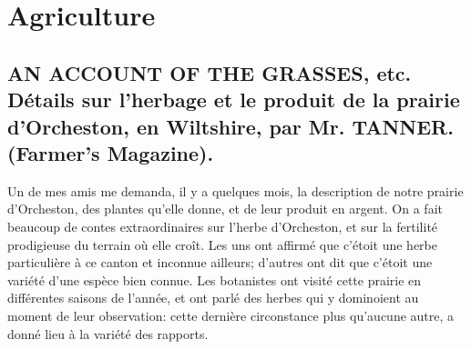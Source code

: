 \setcounter{page}{66}
\chapter{Agriculture}
\section{AN ACCOUNT OF THE GRASSES, etc. Détails sur l'herbage et le produit de la prairie d'Orcheston, en Wiltshire, par Mr. TANNER. (Farmer's Magazine).}
Un de mes amis me demanda, il y a quelques mois, la description de notre prairie d'Orcheston, des plantes qu'elle donne, et de leur produit en argent. On a fait beaucoup\setcounter{page}{67} de contes extraordinaires sur l'herbe d'Orcheston, et sur la fertilité prodigieuse du terrain où elle croît. Les uns ont affirmé que c'étoit une herbe particulière à ce canton et inconnue ailleurs; d'autres ont dit que c'étoit une variété d'une espèce bien connue. Les botanistes ont visité cette prairie en différentes saisons de l'année, et ont parlé des herbes qui y dominoient au moment de leur observation: cette dernière circonstance plus qu'aucune autre, a donné lieu à la variété des rapports.
